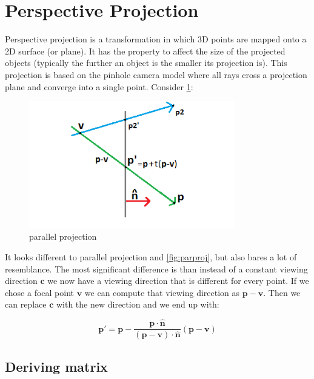 \documentclass[]{report}   %
\begin{document}
\pagebreak
\section{Perspective Projection}

Perspective projection is a transformation in which 3D points are mapped onto a 2D surface (or plane). It has the property to affect the size of the projected objects (typically the further an object is the smaller its projection is). This projection is based on the pinhole camera model where all rays cross a projection plane and converge into a single point. Consider \ref{fig:persproj}: 
\begin{figure}[htb]
\centering
\includegraphics[width=0.8\textwidth]{persp-projection-diagram}
\caption{parallel projection}
\label{fig:persproj}
\end{figure}

It looks different to parallel projection and \ref{fig:parproj}, but also bares a lot of resemblance. The most significant difference is than instead of a constant viewing direction \(\mathbf{c}\) we now have a viewing direction that is different for every point. If we chose a focal point \(\mathbf{v}\) we can compute that viewing direction as \(\mathbf{p}-\mathbf{v}\). Then we can replace \(\mathbf{c}\) with the new direction and we end up with:
\begin{mdframed}
\[
	\mathbf{p\prime} = \mathbf{p} - \frac{\mathbf{p} \cdot \mathbf{\hat{n}}}{(\mathbf{p}-\mathbf{v}) \cdot \mathbf{\hat{n}}} 
	(\mathbf{p}-\mathbf{v})
\]
\end{mdframed}


\subsection{Deriving matrix}
\end{document}
